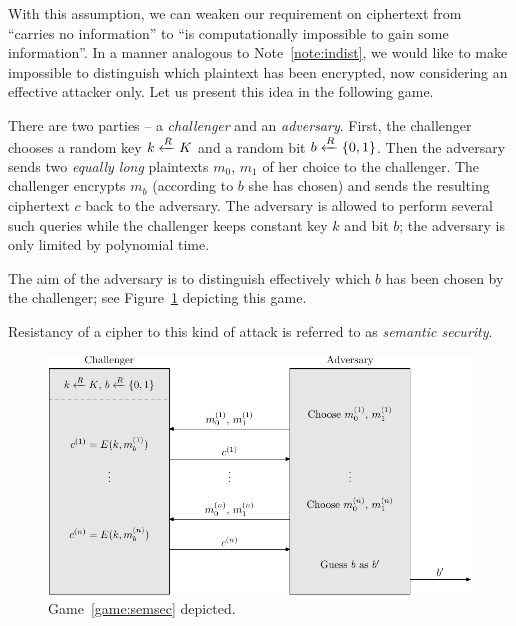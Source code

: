 With this assumption, we can weaken our requirement on ciphertext from ``carries no information'' to ``is computationally impossible to gain some information''. In a manner analogous to Note~\ref{note:indist}, we would like to make impossible to distinguish which plaintext has been encrypted, now considering an effective attacker only. Let us present this idea in the following game.

\begin{game}
\label{game:semsec}
	There are two parties -- a {\em challenger} and an {\em adversary}. First, the challenger chooses a random key $k\xleftarrow{R} K$ and a random bit $b\xleftarrow{R}\{0,1\}$. Then the adversary sends two {\em equally long} plaintexts $m_0$, $m_1$ of her choice to the challenger. The challenger encrypts $m_b$ (according to $b$ she has chosen) and sends the resulting ciphertext $c$ back to the adversary. The adversary is allowed to perform several such queries while the challenger keeps constant key $k$ and bit $b$; the adversary is only limited by polynomial time.
	
	The aim of the adversary is to distinguish effectively which $b$ has been chosen by the challenger; see Figure~\ref{fig:semsecgame} depicting this game.
\end{game}

\begin{note}
\label{note:semsec}
	Resistancy of a cipher to this kind of attack is referred to as {\em semantic security}.
\end{note}

\begin{figure}[H]
\begin{center}
	\includegraphics{./figures/game_semsec/game_semsec-1.pdf}
	\caption{Game~\ref{game:semsec} depicted.}
	\label{fig:semsecgame}
\end{center}
\end{figure}

